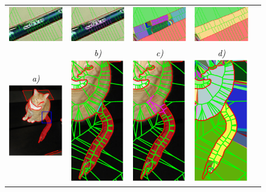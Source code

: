 \begin{figure}[!ht]
\begin{tabular}{ccccc}
    \includegraphics[width=0.15\linewidth]{figs/002227_l1_before_shocks.pdf} &
    \includegraphics[width=0.15\linewidth]{figs/002227_l1_after_shocks.pdf} &
    \includegraphics[width=0.15\linewidth]{figs/002227_l1_before_frags.pdf} &
    \includegraphics[width=0.15\linewidth]{figs/002227_l1_after_frags.pdf} \\
    {\footnotesize\textit{\textcolor{black}{a)}}}    \includegraphics[width=0.15\linewidth]{figs/n02121620_11528_l1.pdf} &
    {\footnotesize\textit{\textcolor{black}{b)}}}\includegraphics[height=0.20\linewidth]{figs/n02121620_11528_l1_before_shocks.pdf} &
    {\footnotesize\textit{\textcolor{black}{c)}}}\includegraphics[height=0.20\linewidth]{figs/n02121620_11528_l1_after_shocks.pdf} &
    {\footnotesize\textit{\textcolor{black}{d)}}}\includegraphics[height=0.20\linewidth]{figs/n02121620_11528_l1_before_frags.pdf} &

\end{tabular}
\end{figure}
